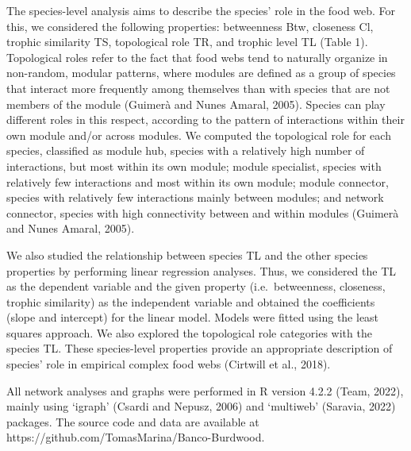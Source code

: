 \documentclass[preprint, 3p,
authoryear]{elsarticle} %
\begin{document}
The species-level analysis aims to describe the species' role in the
food web. For this, we considered the following properties: betweenness
Btw, closeness Cl, trophic similarity TS, topological role TR, and
trophic level TL (Table 1). Topological roles refer to the fact that
food webs tend to naturally organize in non-random, modular patterns,
where modules are defined as a group of species that interact more
frequently among themselves than with species that are not members of
the module (Guimerà and Nunes Amaral, 2005). Species can play different
roles in this respect, according to the pattern of interactions within
their own module and/or across modules. We computed the topological role
for each species, classified as module hub, species with a relatively
high number of interactions, but most within its own module; module
specialist, species with relatively few interactions and most within its
own module; module connector, species with relatively few interactions
mainly between modules; and network connector, species with high
connectivity between and within modules (Guimerà and Nunes Amaral,
2005).

We also studied the relationship between species TL and the other
species properties by performing linear regression analyses. Thus, we
considered the TL as the dependent variable and the given property
(i.e.~betweenness, closeness, trophic similarity) as the independent
variable and obtained the coefficients (slope and intercept) for the
linear model. Models were fitted using the least squares approach. We
also explored the topological role categories with the species TL. These
species-level properties provide an appropriate description of species'
role in empirical complex food webs (Cirtwill et al., 2018).

All network analyses and graphs were performed in R version 4.2.2 (Team,
2022), mainly using `igraph' (Csardi and Nepusz, 2006) and `multiweb'
(Saravia, 2022) packages. The source code and data are available at
https://github.com/TomasMarina/Banco-Burdwood.
\end{document}

